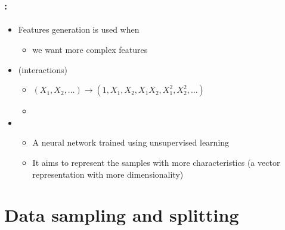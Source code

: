 \documentclass[xcolor=table]{beamer}
\begin{document}
\begin{frame}
	\frametitle{\insertshortsubtitle: \insertsection}
	\framesubtitle{\insertsubsection}
	
			
			\begin{itemize}
				\item Features generation is used when
				\begin{itemize}
					\item we want more complex features
				\end{itemize}
				\item {} (interactions)
				\begin{itemize}
					\item $(X_1, X_2, \ldots) \longrightarrow (1, X_1, X_2, X_1 X_2, X_1^2, X_2^2, \ldots)$
					\item {}
				\end{itemize}
				\item {}
				\begin{itemize}
					\item A neural network trained using unsupervised learning
					\item It aims to represent the samples with more characteristics (a vector representation with more dimensionality)
				\end{itemize}
			\end{itemize}
	
\end{frame}

\section{Data sampling and splitting}

\begin{frame}
	\frametitle{\insertshortsubtitle}
	\framesubtitle{\insertsection}
	
	
\end{frame}
\end{document}
